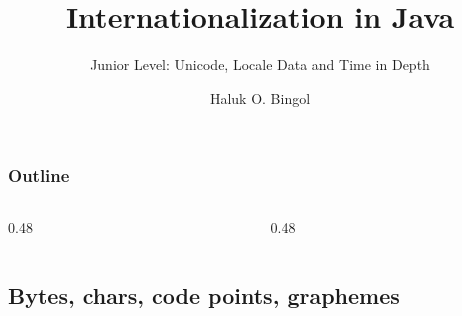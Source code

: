 \documentclass[aspectratio=169,10pt,compress]{beamer}
\title{Internationalization in Java}
\subtitle{Junior Level: Unicode, Locale Data and Time in Depth}
\author[Bingol]{Haluk O. Bingol}
\institute[FCIS]{
    Faculty of Computer and Information Sciences\\
    Yeditepe University
}
\date{
	{\tiny \hbTimeStamp}
}
\begin{document}
\begin{frame}[t,fragile]
  \titlepage
\end{frame}




\begin{frame}[t,fragile] \frametitle{Outline}
  \begin{columns}[T]
    \begin{column}{0.48\textwidth}
      \tableofcontents[sections={1-3}, hideallsubsections]
    \end{column}
    \begin{column}{0.48\textwidth}
      \tableofcontents[sections={4-20}, hideallsubsections]
    \end{column}
  \end{columns}
\end{frame}


\subsection[Units]{Bytes, chars, code points, graphemes}
\end{document}
